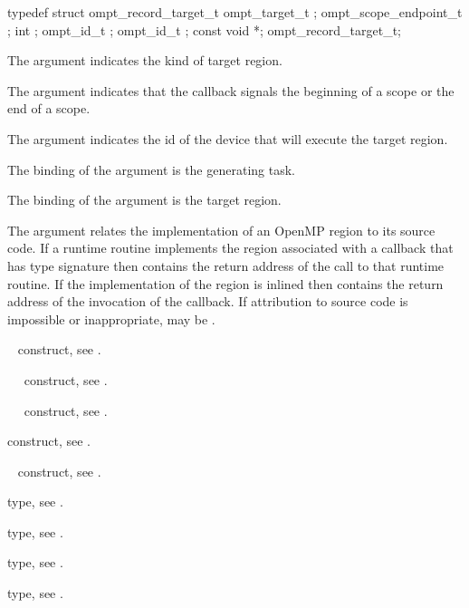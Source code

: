 \record
\begin{ccppspecific}
\begin{omptRecord}
typedef struct ompt_record_target_t {
  ompt_target_t ;
  ompt_scope_endpoint_t ;
  int ;
  ompt_id_t ;
  ompt_id_t ;
  const void *;
} ompt_record_target_t;
\end{omptRecord}
\end{ccppspecific}


\argdesc
The  argument indicates the kind of target region.

The  argument indicates that the callback signals 
the beginning of a scope or the end of a scope.

The  argument indicates the id of the device that
will execute the target region.

The binding of the  argument is the generating task.

The binding of the  argument is the target region.

The  argument relates the implementation of an OpenMP region
to its source code. If a runtime routine implements the region associated with
a callback that has type signature  then
 contains the return address of the call to that runtime routine.
If the implementation of the region is inlined then  contains the
return address of the invocation of the callback. If attribution to source code
is impossible or inappropriate,  may be .

\begin{crossrefs}
\item {}~ construct, see .

\item {}~~ construct, 
see .

\item {}~~ construct, 
see .

\item {} construct, see .

\item {}~ construct, 
see .

\item {} type, see .

\item {} type, see .

\item {} type, see
.

\item {} type, see .
\end{crossrefs}



